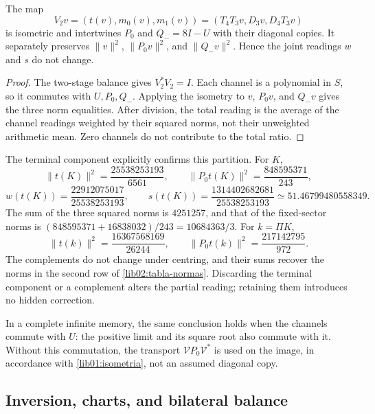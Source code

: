 \begin{proposition}
\label{lib02:memoria-ternaria}
The map
\[
 V_2v=(t(v),m_0(v),m_1(v))
 =(T_4T_3v,D_3v,D_4T_3v)
\]
is isometric and intertwines \(P_0\) and \(Q_-=8I-U\) with their diagonal copies. It separately preserves \(\|v\|^2\), \(\|P_0v\|^2\), and \(\|Q_-v\|^2\). Hence the joint readings \(w\) and \(s\) do not change.
\end{proposition}
\begin{proof}
The two-stage balance gives \(V_2^*V_2=I\). Each channel is a polynomial in \(S\), so it commutes with \(U,P_0,Q_-\). Applying the isometry to \(v\), \(P_0v\), and \(Q_-v\) gives the three norm equalities. After division, the total reading is the average of the channel readings weighted by their squared norms, not their unweighted arithmetic mean. Zero channels do not contribute to the total ratio.
\end{proof}

The terminal component explicitly confirms this partition. For \(K\),
\[
 \|t(K)\|^2=\frac{25538253193}{6561},\qquad
 \|P_0t(K)\|^2=\frac{848595371}{243},
\]
\[
 w(t(K))=\frac{22912075017}{25538253193},\qquad
 s(t(K))=\frac{1314402682681}{25538253193}
 \simeq51.46799480558349.
\]
The sum of the three squared norms is \(4251257\), and that of the fixed-sector norms is \((848595371+16838032)/243=10684363/3\). For \(k=\Pi K\),
\[
 \|t(k)\|^2=\frac{16367568169}{26244},\qquad
 \|P_0t(k)\|^2=\frac{217142795}{972}.
\]
The complements do not change under centring, and their sums recover the norms in the second row of \eqref{lib02:tabla-normas}. Discarding the terminal component or a complement alters the partial reading; retaining them introduces no hidden correction.

In a complete infinite memory, the same conclusion holds when the channels commute with \(U\): the positive limit and its square root also commute with it. Without this commutation, the transport \(\mathcal VP_0\mathcal V^*\) is used on the image, in accordance with \cref{lib01:isometria}, not an assumed diagonal copy.

\subsection{Inversion, charts, and bilateral balance}
\label{lib02:bidireccional}

